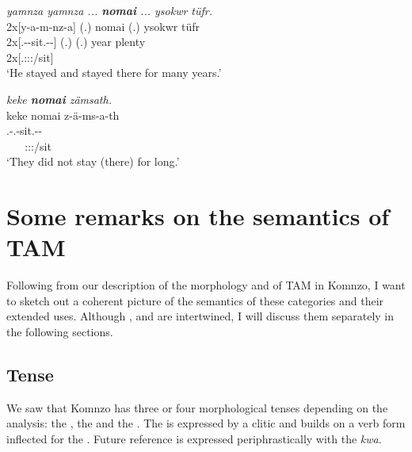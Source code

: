 \begin{exe}
	\ex \emph{yamnza yamnza ... \textbf{nomai} ... ysokwr tüfr.}\\
	\glll 2x[y-a-m-nz-a] (.) nomai (.) ysokwr tüfr\\
	2x[\Tsg.\Alph-\Vc-sit.\Ext-\Ndu-\Pst] (.) \Hab{} (.) year plenty\\
	{\footnotesize 2x[\Tsg.\Masc:\Sbj:\Pst:\Ipfv/sit]} ~ ~ ~ ~ ~\\
	\trans `He stayed and stayed there for many years.' 
	\label{ex316}
\end{exe}
\begin{exe}
	\ex \emph{keke \textbf{nomai} zämsath.}\\
	\glll keke nomai z-ä-ms-a-th\\
	{\Neg} \Hab{} \M.\Gam-\Vc.\Ndu-sit.\Ext-\Pst-\Stnsg{}\\
	~ ~ {\footnotesize \Stpl:\Sbj:\Pst:\Pfv/sit}\\
	\trans `They did not stay (there) for long.' 
	\label{ex317}
\end{exe}

\section{Some remarks on the semantics of TAM}\label{TAMsemantics}

Following from our description of the morphology and  of TAM in Komnzo, I want to sketch out a coherent picture of the semantics of these categories and their extended uses. Although ,  and  are intertwined, I will discuss them separately in the following sections.

\subsection{Tense}\label{TAMsemtense}

We saw that Komnzo has three or four morphological tenses depending on the analysis: the , the  and the . The  is expressed by a clitic and builds on a verb form inflected for the . Future reference is expressed periphrastically with the  \emph{kwa}.

